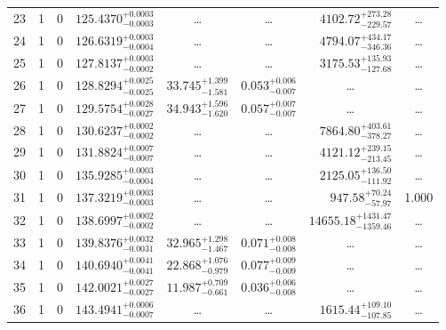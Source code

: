 \begin{table*}[!]
\begin{tabular}{llcrrlrc}
23 & 1 & 0 & $    125.4370_{-      0.0003}^{+      0.0003}$ & \multicolumn{1}{c}{\dots} & \multicolumn{1}{c}{\dots} & $     4102.72_{-      229.57}^{+      273.28}$ & \dots \\[1pt]
24 & 1 & 0 & $    126.6319_{-      0.0004}^{+      0.0003}$ & \multicolumn{1}{c}{\dots} & \multicolumn{1}{c}{\dots} & $     4794.07_{-      346.36}^{+      434.17}$ & \dots \\[1pt]
25 & 1 & 0 & $    127.8137_{-      0.0002}^{+      0.0003}$ & \multicolumn{1}{c}{\dots} & \multicolumn{1}{c}{\dots} & $     3175.53_{-      127.68}^{+      135.93}$ & \dots \\[1pt]
26 & 1 & 0 & $    128.8294_{-      0.0025}^{+      0.0025}$ & $      33.745_{-       1.581}^{+       1.399}$ & $       0.053_{-       0.007}^{+       0.006}$ & \multicolumn{1}{c}{\dots} & \dots \\[1pt]
27 & 1 & 0 & $    129.5754_{-      0.0027}^{+      0.0028}$ & $      34.943_{-       1.620}^{+       1.596}$ & $       0.057_{-       0.007}^{+       0.007}$ & \multicolumn{1}{c}{\dots} & \dots \\[1pt]
28 & 1 & 0 & $    130.6237_{-      0.0002}^{+      0.0002}$ & \multicolumn{1}{c}{\dots} & \multicolumn{1}{c}{\dots} & $     7864.80_{-      378.27}^{+      403.61}$ & \dots \\[1pt]
29 & 1 & 0 & $    131.8824_{-      0.0007}^{+      0.0007}$ & \multicolumn{1}{c}{\dots} & \multicolumn{1}{c}{\dots} & $     4121.12_{-      213.45}^{+      239.15}$ & \dots \\[1pt]

30 & 1 & 0 & $    135.9285_{-      0.0004}^{+      0.0003}$ & \multicolumn{1}{c}{\dots} & \multicolumn{1}{c}{\dots} & $     2125.05_{-      111.92}^{+      136.50}$ & \dots \\[1pt]
31 & 1 & 0 & $    137.3219_{-      0.0003}^{+      0.0003}$ & \multicolumn{1}{c}{\dots} & \multicolumn{1}{c}{\dots} & $      947.58_{-       57.97}^{+       70.24}$ & 1.000 \\[1pt]
32 & 1 & 0 & $    138.6997_{-      0.0002}^{+      0.0002}$ & \multicolumn{1}{c}{\dots} & \multicolumn{1}{c}{\dots} & $    14655.18_{-     1359.46}^{+     1431.47}$ & \dots \\[1pt]
33 & 1 & 0 & $    139.8376_{-      0.0031}^{+      0.0032}$ & $      32.965_{-       1.467}^{+       1.298}$ & $       0.071_{-       0.008}^{+       0.008}$ & \multicolumn{1}{c}{\dots} & \dots \\[1pt]
34 & 1 & 0 & $    140.6940_{-      0.0041}^{+      0.0041}$ & $      22.868_{-       0.979}^{+       1.076}$ & $       0.077_{-       0.009}^{+       0.009}$ & \multicolumn{1}{c}{\dots} & \dots \\[1pt]
35 & 1 & 0 & $    142.0021_{-      0.0027}^{+      0.0027}$ & $      11.987_{-       0.661}^{+       0.709}$ & $       0.036_{-       0.008}^{+       0.006}$ & \multicolumn{1}{c}{\dots} & \dots \\[1pt]
36 & 1 & 0 & $    143.4941_{-      0.0007}^{+      0.0006}$ & \multicolumn{1}{c}{\dots} & \multicolumn{1}{c}{\dots} & $     1615.44_{-      107.85}^{+      109.10}$ & \dots \\[1pt]


\end{tabular}
\end{table*}
